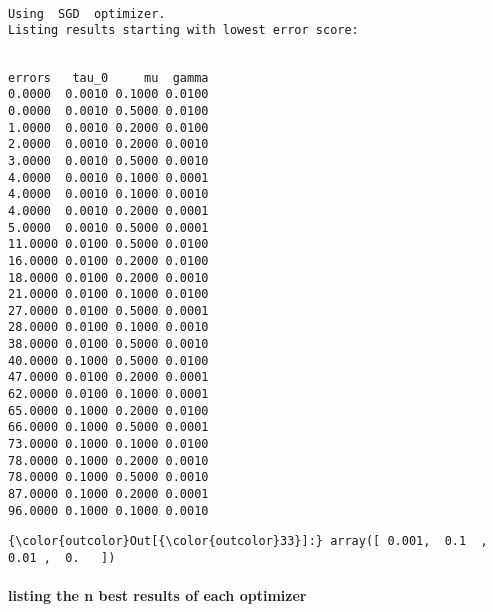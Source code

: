 \documentclass[11pt]{article}
\begin{document}
    \begin{Verbatim}[commandchars=\\\{\}]

Using  SGD  optimizer.
Listing results starting with lowest error score: 


    \end{Verbatim}

    
    \begin{verbatim}
errors   tau_0     mu  gamma
0.0000  0.0010 0.1000 0.0100
0.0000  0.0010 0.5000 0.0100
1.0000  0.0010 0.2000 0.0100
2.0000  0.0010 0.2000 0.0010
3.0000  0.0010 0.5000 0.0010
4.0000  0.0010 0.1000 0.0001
4.0000  0.0010 0.1000 0.0010
4.0000  0.0010 0.2000 0.0001
5.0000  0.0010 0.5000 0.0001
11.0000 0.0100 0.5000 0.0100
16.0000 0.0100 0.2000 0.0100
18.0000 0.0100 0.2000 0.0010
21.0000 0.0100 0.1000 0.0100
27.0000 0.0100 0.5000 0.0001
28.0000 0.0100 0.1000 0.0010
38.0000 0.0100 0.5000 0.0010
40.0000 0.1000 0.5000 0.0100
47.0000 0.0100 0.2000 0.0001
62.0000 0.0100 0.1000 0.0001
65.0000 0.1000 0.2000 0.0100
66.0000 0.1000 0.5000 0.0001
73.0000 0.1000 0.1000 0.0100
78.0000 0.1000 0.2000 0.0010
78.0000 0.1000 0.5000 0.0010
87.0000 0.1000 0.2000 0.0001
96.0000 0.1000 0.1000 0.0010
    \end{verbatim}

    
\begin{Verbatim}[commandchars=\\\{\}]
{\color{outcolor}Out[{\color{outcolor}33}]:} array([ 0.001,  0.1  ,  0.01 ,  0.   ])
\end{Verbatim}
            
    \hypertarget{listing-the-n-best-results-of-each-optimizer}{%
\paragraph{listing the n best results of each
optimizer}\label{listing-the-n-best-results-of-each-optimizer}}
\end{document}

